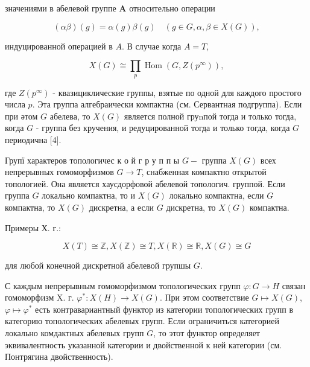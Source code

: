\documentclass[10pt]{article}
\begin{document}
значениями в абелевой группе $\boldsymbol{A}$ относительно операции



\[

(\alpha \beta)(g)=\alpha(g) \beta(g) \quad(g \in G, \alpha, \beta \in X(G)),

\]



индуцированной операцией в $A$. В случае когда $A=T$,



\[

X(G) \cong \prod_{p} \operatorname{Hom}\left(G, Z\left(p^{\infty}\right)\right),

\]



где $Z\left(p^{\infty}\right)$ - квазициклические группы, взятые по одной для каждого простого числа $p$. Эта группа алгебраически компактна (см. Сервантная подгруппа). Если при әтом $G$ абелева, то $X(G)$ является полной груnпой тогда и только тогда, когда $G$ - группа без кручения, и редуцированной тогда и только тогда, когда $G$ периодична [4].



Групї характеров топологичес к о й $г$ р у п п ы $G-$ группа $X(G)$ всех непрерывных гомоморфизмов $G \rightarrow T$, снабженная компактно открытой топологией. Она является хаусдорфовой абелевой топологич. группой. Если группа $G$ локально компактна, то и $X(G)$ локально компактна, если $G$ компактна, то $X(G)$ дискретна, а если $G$ дискретна, то $X(G)$ компактна.



Примеры Х. г.:



\[

X(T) \cong \mathbb{Z}, X(\mathbb{Z}) \cong T, X(\mathbb{R}) \cong \mathbb{R}, X(G) \cong G

\]



для любой конечной дискретной абелевой групшы $G$.



С каждым непрерывным гомоморфизмом топологических групп $\varphi: G \rightarrow H$ связан гомоморфизм X. г. $\varphi^{*}: X(H) \rightarrow X(G)$. При этом соответствие $G \mapsto X(G)$, $\varphi \mapsto \varphi^{*}$ есть контравариантный функтор из категории топологических групп в категорию топологических абелевых групп. Если ограничиться категорией локально комдактных абелевых групп $G$, то этот функтор определяет эквивалентность указанной категории и двойственной к ней категории (см. Понтрягина двойственность).
\end{document}
